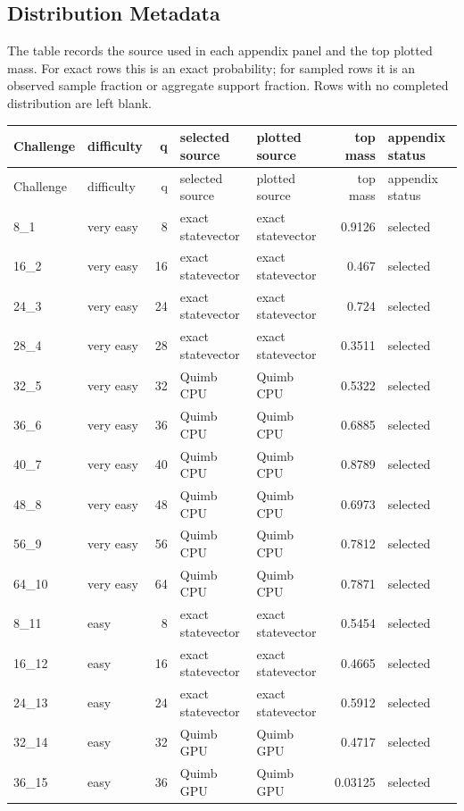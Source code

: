 \subsection*{Distribution Metadata}
The table records the source used in each appendix panel and the top plotted mass. For exact rows this is an exact probability; for sampled rows it is an observed sample fraction or aggregate support fraction. Rows with no completed distribution are left blank.
\scriptsize
\begin{longtable}{l l r l l r l}
\toprule
Challenge & difficulty & q & selected source & plotted source & top mass & appendix status \\
\midrule
\endfirsthead
\toprule
Challenge & difficulty & q & selected source & plotted source & top mass & appendix status \\
\midrule
\endhead
8\_1 & very easy & 8 & exact statevector & exact statevector & 0.9126 & selected \\
16\_2 & very easy & 16 & exact statevector & exact statevector & 0.467 & selected \\
24\_3 & very easy & 24 & exact statevector & exact statevector & 0.724 & selected \\
28\_4 & very easy & 28 & exact statevector & exact statevector & 0.3511 & selected \\
32\_5 & very easy & 32 & Quimb CPU & Quimb CPU & 0.5322 & selected \\
36\_6 & very easy & 36 & Quimb CPU & Quimb CPU & 0.6885 & selected \\
40\_7 & very easy & 40 & Quimb CPU & Quimb CPU & 0.8789 & selected \\
48\_8 & very easy & 48 & Quimb CPU & Quimb CPU & 0.6973 & selected \\
56\_9 & very easy & 56 & Quimb CPU & Quimb CPU & 0.7812 & selected \\
64\_10 & very easy & 64 & Quimb CPU & Quimb CPU & 0.7871 & selected \\
8\_11 & easy & 8 & exact statevector & exact statevector & 0.5454 & selected \\
16\_12 & easy & 16 & exact statevector & exact statevector & 0.4665 & selected \\
24\_13 & easy & 24 & exact statevector & exact statevector & 0.5912 & selected \\
32\_14 & easy & 32 & Quimb GPU & Quimb GPU & 0.4717 & selected \\
36\_15 & easy & 36 & Quimb GPU & Quimb GPU & 0.03125 & selected \\

\end{longtable}
